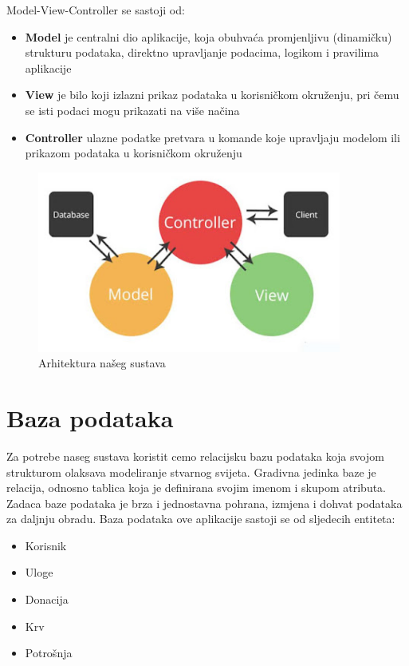 	 {Model-View-Controller se sastoji od:}
	\begin{itemize}
		\item 	\textbf{Model} {je centralni dio aplikacije, koja obuhvaća promjenljivu (dinamičku) strukturu podataka, direktno upravljanje podacima, logikom i pravilima aplikacije}
		\item 	\textbf{View}{ je bilo koji izlazni prikaz podataka u korisničkom okruženju, pri čemu se isti podaci mogu prikazati na više načina}
		\item 	\textbf{Controller} {ulazne podatke pretvara u komande koje upravljaju modelom ili prikazom podataka u korisničkom okruženju}
	\end{itemize}
	
		\begin{figure}[H]
			\centering
			\includegraphics[width=100mm, scale=0.1]{slike/MVC.jpeg}
			\caption{Arhitektura našeg sustava}
			\label{fig:arhitektura}
		\end{figure}
\eject

		

				
		\section{Baza podataka}
			
			
			
		Za potrebe naseg sustava koristit cemo relacijsku bazu podataka koja svojom strukturom olaksava modeliranje stvarnog svijeta. Gradivna jedinka baze je relacija, odnosno tablica koja je definirana svojim imenom i skupom atributa. Zadaca baze podataka je brza i jednostavna pohrana, izmjena i dohvat podataka za daljnju obradu.
Baza podataka ove aplikacije sastoji se od sljedecih entiteta: 
\begin{itemize}
		\item Korisnik
		\item Uloge
		\item Donacija
		\item Krv
		\item Potrošnja
	\end{itemize}

